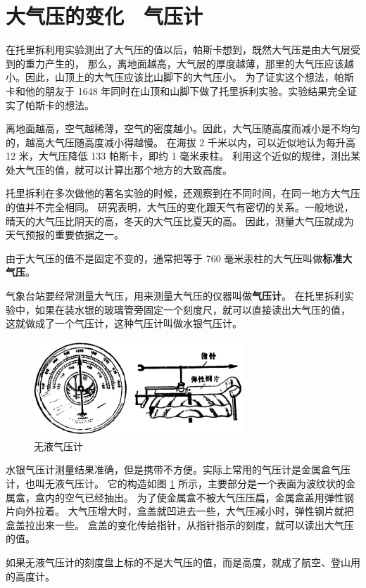 \section{大气压的变化　气压计}\label{sec:5-12}

在托里拆利用实验测出了大气压的值以后，帕斯卡想到，既然大气压是由大气层受到的重力产生的，
那么，离地面越高，大气层的厚度越薄，那里的大气压应该越小。因此，山顶上的大气压应该比山脚下的大气压小。
为了证实这个想法，帕斯卡和他的朋友于 1648 年同时在山顶和山脚下做了托里拆利实验。实验结果完全证实了帕斯卡的想法。

离地面越高，空气越稀薄，空气的密度越小。因此，大气压随高度而减小是不均匀的，越高大气压随高度减小得越慢。
在海拔 2 千米以内，可以近似地认为每升高 12 米，大气压降低 133 帕斯卡，即约 1 毫米汞柱。
利用这个近似的规律，测出某处大气压的值，就可以计算出那个地方的大致高度。

托里拆利在多次做他的著名实验的时候，还观察到在不同时间，在同一地方大气压的值并不完全相同。
研究表明，大气压的变化跟天气有密切的关系。一般地说，晴天的大气压比阴天的高，冬天的大气压比夏天的高。
因此，测量大气压就成为天气预报的重要依据之一。

由于大气压的值不是固定不变的，通常把等于 760 毫米汞柱的大气压叫做\textbf{标准大气压}。

气象台站要经常测量大气压，用来测量大气压的仪器叫做\textbf{气压计}。
在托里拆利实验中，如果在装水银的玻璃管旁固定一个刻度尺，就可以直接读出大气压的值，
这就做成了一个气压计，这种气压计叫做水银气压计。

\begin{figure}[htbp]
    \centering
    \includegraphics[width=0.7\textwidth]{../pic/czwl1-ch5-45}
    \caption{无液气压计}\label{fig:5-45}
\end{figure}

水银气压计测量结果准确，但是携带不方便。实际上常用的气压计是金属盒气压计，也叫无液气压计。
它的构造如图 \ref{fig:5-45} 所示，主要部分是一个表面为波纹状的金属盒，盒内的空气已经抽出。
为了使金属盒不被大气压压扁，金属盒盖用弹性钢片向外拉着。
大气压增大时，盒盖就凹进去一些，大气压减小时，弹性钢片就把盒盖拉出来一些。
盒盖的变化传给指针，从指针指示的刻度，就可以读出大气压的值。

如果无液气压计的刻度盘上标的不是大气压的值，而是高度，就成了航空、登山用的高度计。

